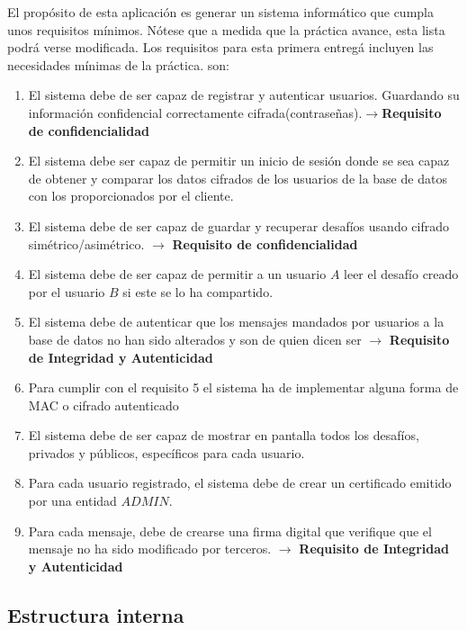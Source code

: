 \documentclass[a4paper,11pt]{article}
\begin{document}
El propósito de esta aplicación es generar un sistema informático que cumpla
unos requisitos mínimos. Nótese que a medida que la práctica avance, esta lista
podrá verse modificada. Los requisitos para esta primera entregá incluyen las
necesidades mínimas de la práctica.
son:\begin{enumerate}
    \item El sistema debe de ser capaz de registrar y autenticar usuarios.
        Guardando su información confidencial correctamente cifrada(contraseñas).$\rightarrow$\textbf{Requisito de confidencialidad}
    \item El sistema debe ser capaz de permitir un inicio de sesión donde se sea capaz de obtener y comparar 
        los datos cifrados de los usuarios de la base de datos con los proporcionados por el cliente.
    \item El sistema debe de ser capaz de guardar y recuperar desafíos usando
        cifrado simétrico/asimétrico. 
        $\rightarrow$ \textbf{Requisito de confidencialidad}
    \item El sistema debe de ser capaz de permitir a un usuario $A$ leer el desafío creado por el usuario $B$ si este se lo ha compartido.
    \item El sistema debe de autenticar que los mensajes mandados por usuarios a la
        base de datos no han sido alterados y son de quien dicen ser $\rightarrow$ \textbf{Requisito de Integridad y
        Autenticidad}
    \item Para cumplir con el requisito 5 el sistema ha de implementar alguna
        forma de MAC o cifrado autenticado
    \item El sistema debe de ser capaz de mostrar en pantalla todos los
        desafíos, privados y públicos, específicos para cada usuario.
    \item Para cada usuario registrado, el sistema debe de crear un certificado emitido por una entidad $ADMIN$.
    \item Para cada mensaje, debe de crearse una firma digital que verifique que el mensaje 
        no ha sido modificado por terceros. $\rightarrow$ \textbf{Requisito de Integridad y Autenticidad}
\end{enumerate}

\subsection{Estructura interna}
\end{document}
